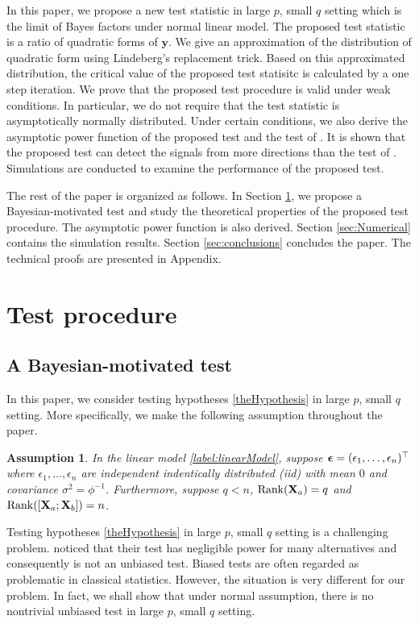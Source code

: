 \documentclass[11pt]{article}
\DeclareMathOperator{\myRank}{Rank}
\newcommand{\By}{\mathbf{y}}    \newcommand{\Bz}{\mathbf{z}}
\theoremstyle{plain}
\newtheorem{assumption}{\quad\quad Assumption}
\theoremstyle{definition}
\theoremstyle{remark}
\begin{document}
In this paper, we propose a new test statistic in large $p$, small $q$ setting which is the limit of Bayes factors under normal linear model.
The proposed test statistic is a ratio of quadratic forms of $\By$.
We give an approximation of the distribution of quadratic form using Lindeberg's replacement trick.
Based on this approximated distribution, the critical value of the proposed test statisitc is calculated by a one step iteration.
We prove that the proposed test procedure is valid under weak conditions.
In particular, we do not require that the test statistic is asymptotically normally distributed.
Under certain conditions, we also derive the asymptotic power function of the proposed test and the test of \cite{Goeman2006}.
It is shown that the proposed test can detect the signals from more directions than the test of \cite{Goeman2006}.
Simulations are conducted to examine the performance of the proposed test.


The rest of the paper is organized as follows.
In Section \ref{sec:methodology}, we propose a Bayesian-motivated test and study the theoretical properties of the proposed test procedure.
The asymptotic power function is also derived.
Section \ref{sec:Numerical} contains the simulation results. 
Section \ref{sec:conclusions} concludes the paper.
The technical proofs are presented in Appendix.




\section{Test procedure}\label{sec:methodology}
\subsection{A Bayesian-motivated test}
In this paper, we consider testing hypotheses \eqref{theHypothesis} in large $p$, small $q$ setting.
More specifically, we make the following assumption throughout the paper.
\begin{assumption}
    In the linear model \eqref{label:linearModel}, 
    suppose $\boldsymbol{\epsilon}=(\epsilon_1,\ldots,\epsilon_n)^\top$ where $\epsilon_1,\ldots, \epsilon_n$ are independent indentically distributed (iid) with mean $0$ and covariance $\sigma^2=\phi^{-1}$.
    Furthermore, suppose $q<n$, $\myRank(\BX_a)=q$ and $\myRank([\BX_a; \BX_b])=n$.
    \label{Assumption}
\end{assumption}
Testing hypotheses \eqref{theHypothesis} in large $p$, small $q$ setting is a challenging problem.
\cite{Goeman2006} noticed that their test has negligible power for many alternatives and consequently is not an unbiased test.
Biased tests are often regarded as problematic in classical statistics.
However, the situation is very different for our problem.
In fact, we shall show that under normal assumption, there is no nontrivial unbiased test in large $p$, small $q$ setting.
\end{document}
